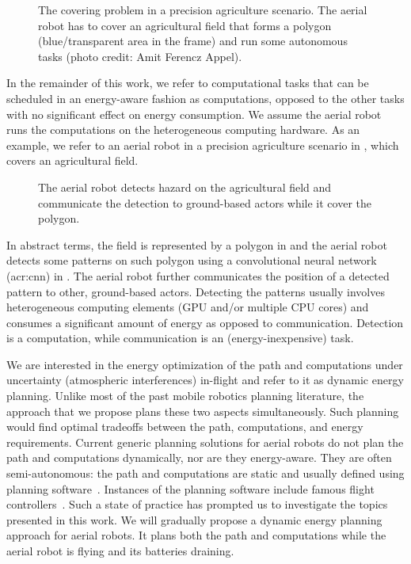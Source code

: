 \begin{figure}[t!]
  \centering
  
  \caption[The covering problem in a precision agriculture scenario]{The covering problem in a precision agriculture scenario. The aerial robot has to cover an agricultural field that forms a polygon (blue/transparent area in the frame) and run some autonomous tasks {\scriptsize(photo credit: Amit Ferencz Appel)}.}
  \label{fig:plot2}
\end{figure}

In the remainder of this work, we refer to computational tasks that can be scheduled in an energy-aware fashion as computations, opposed to the other tasks with no significant effect on energy consumption. We assume the aerial robot runs the computations on the heterogeneous computing hardware. As an example, we refer to an aerial robot in a precision agriculture scenario in , which covers an agricultural field. 
\begin{figure}[h]
  \centering
  
  \caption[The hazard detection in the precision agriculture scenario]{The aerial robot detects hazard on the agricultural field and communicate the detection to ground-based actors while it cover the polygon.}
  \label{fig:plot2x}
\end{figure}
In abstract terms, the field is represented by a polygon in  and the aerial robot detects some patterns on such polygon using a convolutional neural network (\Gls{acr:cnn}) in . The aerial robot further communicates the position of a detected pattern to other, ground-based actors. Detecting the patterns usually involves heterogeneous computing elements (GPU and/or multiple CPU cores) and consumes a significant amount of energy as opposed to communication. Detection is a computation, while communication is an (energy-inexpensive) task.

We are interested in the energy optimization of the path and computations under uncertainty (atmospheric interferences) in-flight and refer to it as dynamic energy planning. Unlike most of the past mobile robotics planning literature, the approach that we propose plans these two aspects simultaneously. Such planning would find optimal tradeoffs between the path, computations, and energy requirements. Current generic planning solutions for aerial robots do not plan the path and computations dynamically, nor are they energy-aware. They are often semi-autonomous: the path and computations are static and usually defined using planning software~\citep{daponte2019review}. Instances of the planning software include famous flight controllers~\citep{px4,papa}. Such a state of practice has prompted us to investigate the topics presented in this work. We will gradually propose a dynamic energy planning approach for aerial robots. It plans both the path and computations while the aerial robot is flying and its batteries draining. 


